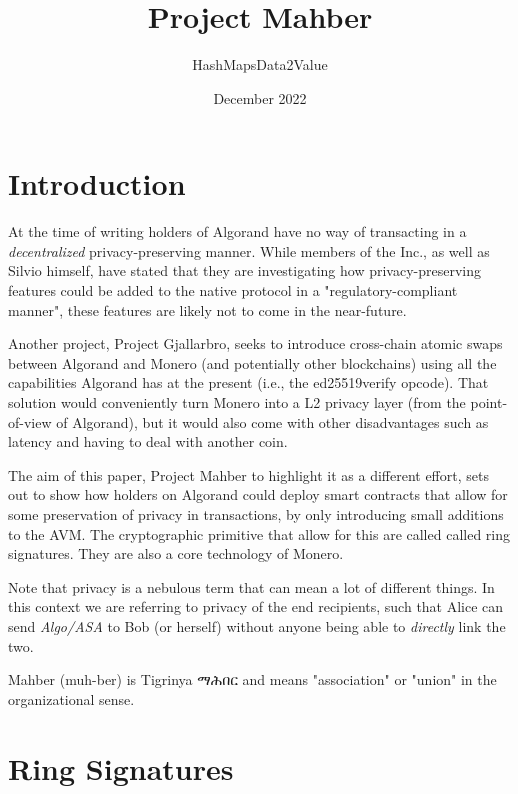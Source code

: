 \documentclass[9pt]{article}
\title{Project Mahber}
\author{HashMapsData2Value}
\date{December 2022}
\newenvironment{geez}
  {\geezfont}
  {}
\begin{document}
\maketitle

\tableofcontents

\newpage

\section{Introduction}

At the time of writing holders of Algorand have no way of transacting in a \textit{decentralized} privacy-preserving manner. While members of the Inc., as well as Silvio himself, have stated that they are investigating how privacy-preserving features could be added to the native protocol in a "regulatory-compliant manner", these features are likely not to come in the near-future.

Another project, Project Gjallarbro, seeks to introduce cross-chain atomic swaps between Algorand and Monero (and potentially other blockchains) using all the capabilities Algorand has at the present (i.e., the ed25519verify opcode). That solution would conveniently turn Monero into a L2 privacy layer (from the point-of-view of Algorand), but it would also come with other disadvantages such as latency and having to deal with another coin.

The aim of this paper, Project Mahber to highlight it as a different effort, sets out to show how holders on Algorand could deploy smart contracts that allow for some preservation of privacy in transactions, by only introducing small additions to the AVM. The cryptographic primitive that allow for this are called called ring signatures. They are also a core technology of Monero.

Note that privacy is a nebulous term that can mean a lot of different things. In this context we are referring to privacy of the end recipients, such that Alice can send \textit{Algo/ASA} to Bob (or herself) without anyone being able to \textit{directly} link the two.

Mahber (muh-ber) is Tigrinya \begin{geez}ማሕበር\end{geez} and means "association" or "union" in the organizational sense.

\section{Ring Signatures}
\end{document}
